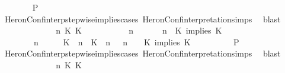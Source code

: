 \begin{isabellebody}
\ \ \ \ \ \ \isamarkupfalse%
\ {\isacharquery}P\isanewline
\ \ \ \ \ \ \ \ \isamarkupfalse%
\ HeronConf{\isacharunderscore}interp{\isacharunderscore}stepwise{\isacharunderscore}implies{\isacharunderscore}cases\ HeronConf{\isacharunderscore}interpretation{\isachardot}simps\ \isamarkupfalse%
\ blast\isanewline
\ \ \ \ \isamarkupfalse%
\isanewline
\ \ \ \ \ \ \isamarkupfalse%
\ {\isasymGamma}\ n\ K\ K\ {\isasymPsi}\ {\isasymPhi}\isanewline
\ \ \ \ \ \ \isamarkupfalse%
\ {\isacartoucheopen}{\isacharparenleft}{\isasymGamma}\ n\ {\isasymturnstile}\ {\isasymPsi}\ {\isasymtriangleright}\ {\isasymPhi}\ {\isacharequal}\ {\isacharparenleft}{\isasymGamma}{\isacharcomma}\ n\ {\isasymturnstile}\ {\isacharparenleft}{\isacharparenleft}K\ implies\ K\ {\isacharhash}\ {\isasymPsi}{\isacharparenright}\ {\isasymtriangleright}\ {\isasymPhi}{\isacharparenright}{\isacartoucheclose}\isanewline
\ \ \ \ \ \ \ {\isacartoucheopen}{\isacharparenleft}{\isasymGamma}\ n\ {\isasymturnstile}\ {\isasymPsi}\ {\isasymtriangleright}\ {\isasymPhi}\ {\isacharequal}\ {\isacharparenleft}{\isacharparenleft}{\isacharparenleft}K\ {\isasymUp}\ n{\isacharparenright}\ {\isacharhash}\ {\isacharparenleft}K\ {\isasymUp}\ n{\isacharparenright}\ {\isacharhash}\ {\isasymGamma}{\isacharparenright}{\isacharcomma}\ n\ {\isasymturnstile}\ {\isasymPsi}\ {\isasymtriangleright}\ {\isacharparenleft}{\isacharparenleft}K\ implies\ K\ {\isacharhash}\ {\isasymPhi}{\isacharparenright}{\isacharparenright}{\isacartoucheclose}\isanewline
\ \ \ \ \ \ \isamarkupfalse%
\ {\isacharquery}P\isanewline
\ \ \ \ \ \ \ \ \isamarkupfalse%
\ HeronConf{\isacharunderscore}interp{\isacharunderscore}stepwise{\isacharunderscore}implies{\isacharunderscore}cases\ HeronConf{\isacharunderscore}interpretation{\isachardot}simps\ \isamarkupfalse%
\ blast\isanewline
\ \ \ \ \isamarkupfalse%
\isanewline
\ \ \ \ \ \ \isamarkupfalse%
\ {\isasymGamma}\ n\ K\ K\ {\isasymPsi}\ {\isasymPhi}\isanewline

\end{isabellebody}
